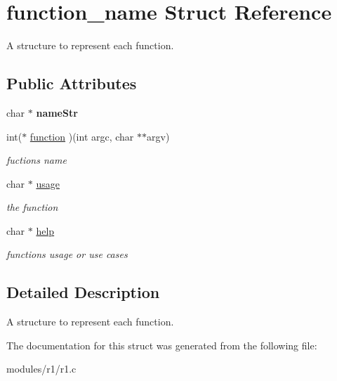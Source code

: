 \hypertarget{structfunction__name}{}\section{function\+\_\+name Struct Reference}
\label{structfunction__name}


A structure to represent each function.  


\subsection*{Public Attributes}
\begin{DoxyCompactItemize}
\item 
char $\ast$ {\bfseries name\+Str}\hypertarget{structfunction__name_a7a94f7f31542a15b63160b6b213e0bcb}{}\label{structfunction__name_a7a94f7f31542a15b63160b6b213e0bcb}

\item 
int($\ast$ \hyperlink{structfunction__name_ad80214b3eea6c438c13ff5461c5350ab}{function} )(int argc, char $\ast$$\ast$argv)\hypertarget{structfunction__name_ad80214b3eea6c438c13ff5461c5350ab}{}\label{structfunction__name_ad80214b3eea6c438c13ff5461c5350ab}

\begin{DoxyCompactList}\small\item\em fuction\textquotesingle{}s name \end{DoxyCompactList}\item 
char $\ast$ \hyperlink{structfunction__name_a30f593e52febda0cc9d9703b9015fb0f}{usage}\hypertarget{structfunction__name_a30f593e52febda0cc9d9703b9015fb0f}{}\label{structfunction__name_a30f593e52febda0cc9d9703b9015fb0f}

\begin{DoxyCompactList}\small\item\em the function \end{DoxyCompactList}\item 
char $\ast$ \hyperlink{structfunction__name_ac0f73e570d7d03a9f378a70e6d4d5632}{help}\hypertarget{structfunction__name_ac0f73e570d7d03a9f378a70e6d4d5632}{}\label{structfunction__name_ac0f73e570d7d03a9f378a70e6d4d5632}

\begin{DoxyCompactList}\small\item\em function\textquotesingle{}s usage or use cases \end{DoxyCompactList}\end{DoxyCompactItemize}


\subsection{Detailed Description}
A structure to represent each function. 

The documentation for this struct was generated from the following file\+:\begin{DoxyCompactItemize}
\item 
modules/r1/r1.\+c\end{DoxyCompactItemize}
